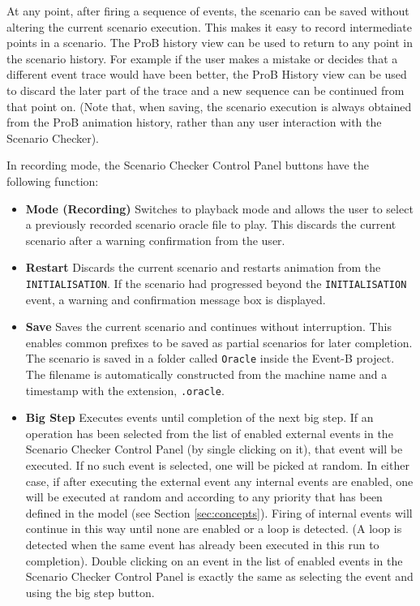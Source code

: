 At any point, after firing a sequence of events, the scenario can be saved without altering the current scenario execution. 
This makes it easy to record intermediate points in a scenario.
The ProB history view can be used to return to any point in the scenario history.
For example if the user makes a mistake or decides that a different event trace would have been better, the ProB History view can be used to discard the later part of the trace and a new sequence can be continued from that point on.
(Note that, when saving, the scenario execution is always obtained from the ProB animation history, rather than any user interaction with the Scenario Checker).

In recording mode, the Scenario Checker Control Panel buttons have the following function:
\begin{itemize}
	\item \textbf{Mode (Recording)}  Switches to playback mode and allows the user to select a previously recorded scenario oracle file to play. This discards the current scenario after a warning confirmation from the user.
	\item \textbf{Restart}  Discards the current scenario and restarts animation from the \texttt{INITIALISATION}. If the scenario had progressed beyond the \texttt{INITIALISATION} event, a warning and confirmation message box is displayed.
	\item \textbf{Save}  Saves the current scenario and continues without interruption. This enables common prefixes to be saved as partial scenarios for later completion. The scenario is saved in a folder called \texttt{Oracle} inside the Event-B project. The filename is automatically constructed from the machine name and a timestamp with the extension, \texttt{.oracle}.
	\item \textbf{Big Step}  Executes events until completion of the next big step. If an operation has been selected from the list of enabled external events in the Scenario Checker Control Panel (by single clicking on it), that event will be executed. If no such event is selected, one will be picked at random. In either case, if after executing the external event any internal events are enabled, one will be executed at random and according to any priority that has been defined in the model (see Section \ref{sec:concepts}). Firing of internal events will continue in this way until none are enabled or a loop is detected. (A loop is detected when the same event has already been executed in this run to completion). Double clicking on an event in the list of enabled events in the Scenario Checker Control Panel is exactly the same as selecting the event and using the big step button.

\end{itemize}
